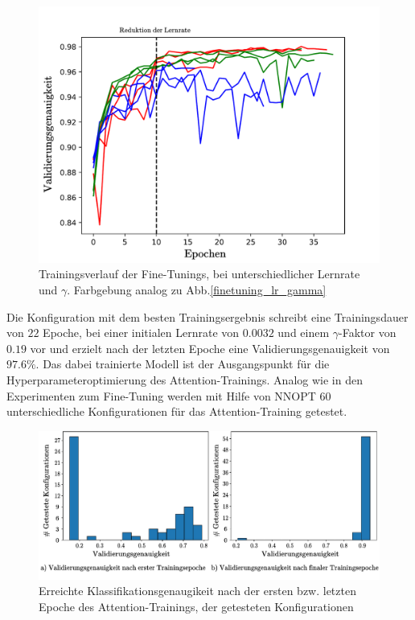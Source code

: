 \begin{figure}[h]
\centering
\includegraphics[scale=0.6]{NNOPT/finetuning_lr_gamma_verlauf.pdf}
\caption{Trainingsverlauf der Fine-Tunings, bei unterschiedlicher Lernrate und $\gamma$. Farbgebung analog zu Abb.\ref{finetuning_lr_gamma}}
\label{finetuning_lr_gamma_verlauf}
\end{figure}
\clearpage
Die Konfiguration mit dem besten Trainingsergebnis schreibt eine Trainingsdauer von $22$ Epoche, bei einer initialen Lernrate von $0.0032$ und einem $\gamma$-Faktor von $0.19$ vor und erzielt nach der letzten Epoche eine Validierungsgenauigkeit von $97.6\%$. Das dabei trainierte Modell ist der Ausgangspunkt für die Hyperparameteroptimierung des Attention-Trainings. Analog wie in den Experimenten zum Fine-Tuning werden mit Hilfe von NNOPT $60$ unterschiedliche Konfigurationen für das Attention-Training getestet.
\begin{figure}[h]
\includegraphics[scale=0.75]{NNOPT/init_and_end_perf_attention.pdf}
\caption{Erreichte Klassifikationsgenaugikeit nach der ersten bzw. letzten Epoche des Attention-Trainings, der getesteten Konfigurationen}
\label{attention_int_end}
\end{figure}
